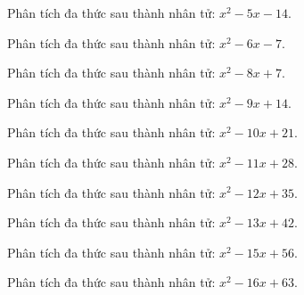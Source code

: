 \begin{bt}
	Phân tích đa thức sau thành nhân tử: $x^2 - 5 x - 14$.
\end{bt}
\begin{bt}
	Phân tích đa thức sau thành nhân tử: $x^2 - 6 x - 7$.
\end{bt}
\begin{bt}
	Phân tích đa thức sau thành nhân tử: $x^2 - 8 x + 7$.
\end{bt}
\begin{bt}
	Phân tích đa thức sau thành nhân tử: $x^2 - 9 x + 14$.
\end{bt}
\begin{bt}
	Phân tích đa thức sau thành nhân tử: $x^2 - 10 x + 21$.
\end{bt}
\begin{bt}
	Phân tích đa thức sau thành nhân tử: $x^2 - 11 x + 28$.
\end{bt}
\begin{bt}
	Phân tích đa thức sau thành nhân tử: $x^2 - 12 x + 35$.
\end{bt}
\begin{bt}
	Phân tích đa thức sau thành nhân tử: $x^2 - 13 x + 42$.
\end{bt}
\begin{bt}
	Phân tích đa thức sau thành nhân tử: $x^2 - 15 x + 56$.
\end{bt}
\begin{bt}
	Phân tích đa thức sau thành nhân tử: $x^2 - 16 x + 63$.
\end{bt}
